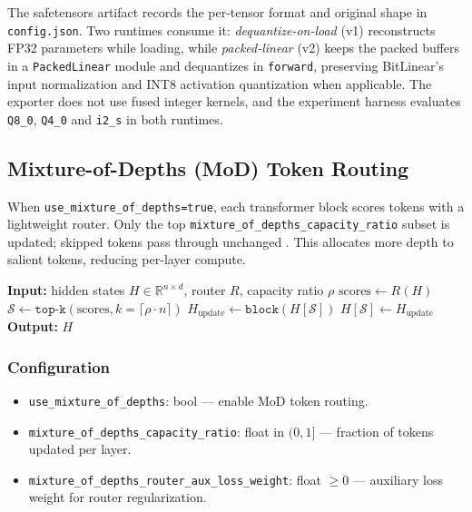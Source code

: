 The safetensors artifact records the per-tensor format and original shape in \texttt{config.json}. Two runtimes consume it: \emph{dequantize-on-load} (v1) reconstructs FP32 parameters while loading, while \emph{packed-linear} (v2) keeps the packed buffers in a \texttt{PackedLinear} module and dequantizes in \texttt{forward}, preserving BitLinear's input normalization and INT8 activation quantization when applicable. The exporter does not use fused integer kernels, and the experiment harness evaluates \texttt{Q8\_0}, \texttt{Q4\_0} and \texttt{i2\_s} in both runtimes.

\subsection{Mixture-of-Depths (MoD) Token Routing}

When \texttt{use\_mixture\_of\_depths=true}, each transformer block scores tokens with a lightweight router. Only the top \texttt{mixture\_of\_depths\_capacity\_ratio} subset is updated; skipped tokens pass through unchanged \citep{zhu2026mixtureofdepthsattention}. This allocates more depth to salient tokens, reducing per-layer compute.

\begin{algorithmic}[1]
\State \textbf{Input:} hidden states $H \in \mathbb{R}^{n \times d}$, router $R$, capacity ratio $\rho$
\State $\text{scores} \gets R(H)$ 
\State $\mathcal{S} \gets \texttt{top-k}(\text{scores}, k=\lceil \rho \cdot n \rceil)$ 
\State $H_{\text{update}} \gets \texttt{block}(H[\mathcal{S}])$ 
\State $H[\mathcal{S}] \gets H_{\text{update}}$ 
\State \textbf{Output:} $H$ 
\end{algorithmic}

\subsubsection{Configuration}
\begin{itemize}[leftmargin=*]
    \item \texttt{use\_mixture\_of\_depths}: bool --- enable MoD token routing.
    \item \texttt{mixture\_of\_depths\_capacity\_ratio}: float in $(0, 1]$ --- fraction of tokens updated per layer.
    \item \texttt{mixture\_of\_depths\_router\_aux\_loss\_weight}: float $\ge 0$ --- auxiliary loss weight for router regularization.
\end{itemize}

